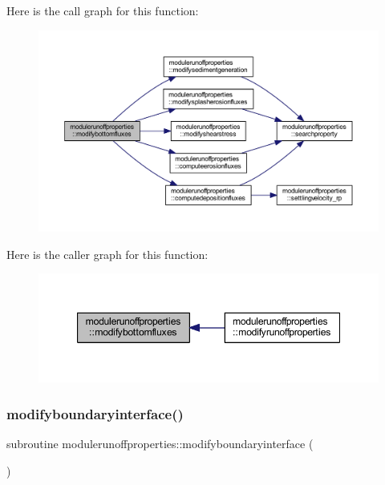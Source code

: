 Here is the call graph for this function\+:\nopagebreak
\begin{figure}[H]
\begin{center}
\leavevmode
\includegraphics[width=350pt]{namespacemodulerunoffproperties_a2c67e89cd73897e22e4941c034891418_cgraph}
\end{center}
\end{figure}
Here is the caller graph for this function\+:\nopagebreak
\begin{figure}[H]
\begin{center}
\leavevmode
\includegraphics[width=347pt]{namespacemodulerunoffproperties_a2c67e89cd73897e22e4941c034891418_icgraph}
\end{center}
\end{figure}
\mbox{\label{namespacemodulerunoffproperties_abb21b8b2577c08fe41a7a41e186272d5}} 
\subsubsection{\texorpdfstring{modifyboundaryinterface()}{modifyboundaryinterface()}}
{\footnotesize\ttfamily subroutine modulerunoffproperties\+::modifyboundaryinterface (\begin{DoxyParamCaption}{ }\end{DoxyParamCaption})\hspace{0.3cm}{\ttfamily [private]}}

